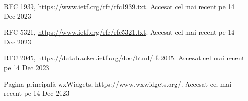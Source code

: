 \documentclass[runningheads]{llncs}
\begin{document}
\renewcommand\refname{Referințe bibliografice}
\begin{thebibliography}{8}
RFC 1939, \url{https://www.ietf.org/rfc/rfc1939.txt}. Accesat cel mai recent pe 14 Dec 2023

RFC 5321, \url{https://www.ietf.org/rfc/rfc5321.txt}. Accesat cel mai recent pe 14 Dec 2023

RFC 2045, \url{https://datatracker.ietf.org/doc/html/rfc2045}. Accesat cel mai recent pe 14 Dec 2023

Pagina principală wxWidgets, \url{https://www.wxwidgets.org/}. Accesat cel mai recent pe 14 Dec 2023


\end{thebibliography}
\end{document}

